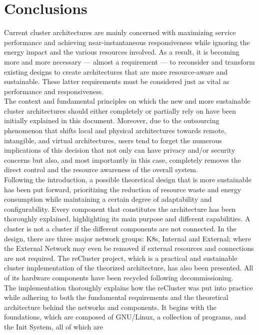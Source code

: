 \chapter{Conclusions}
\label{cha:conclusions}

Current cluster architectures are mainly concerned with maximizing service performance
and achieving near-instantaneous responsiveness while ignoring the energy impact
and the various resources involved. As a result, it is becoming more and more necessary
--- almost a requirement --- to reconsider and transform existing designs to create
architectures that are more resource-aware and sustainable. These latter
requirements must be considered just as vital as performance and responsiveness.
\\ %
The context and fundamental principles on which the new and more sustainable
cluster architectures should either completely or partially rely on have been
initially explained in this document. Moreover, due to the outsourcing
phenomenon that shifts local and physical architectures towards remote, intangible,
and virtual architectures, users tend to forget the numerous implications of this
decision that not only can have privacy and/or security concerns but also, and
most importantly in this case, completely removes the direct control and the resource
awareness of the overall system. \\ %
Following the introduction, a possible theoretical design that is more
sustainable has been put forward, prioritizing the reduction of resource waste and
energy consumption while maintaining a certain degree of adaptability and configurability.
Every component that constitutes the architecture has been thoroughly explained,
highlighting its main purpose and different capabilities. A cluster is not a
cluster if the different components are not connected. In the design, there are
three major network groups: K8s, Internal and External; where the External Network
may even be removed if external resources and connections are not required. The
reCluster project, which is a practical and sustainable cluster implementation of
the theorized architecture, has also been presented. All of its hardware components
have been recycled following decommissioning. \\ %
The implementation thoroughly explains how the reCluster was put into practice while
adhering to both the fundamental requirements and the theoretical architecture behind
the networks and components. It begins with the foundations, which are composed of
GNU/Linux, a collection of programs, and the Init System, all of which are
